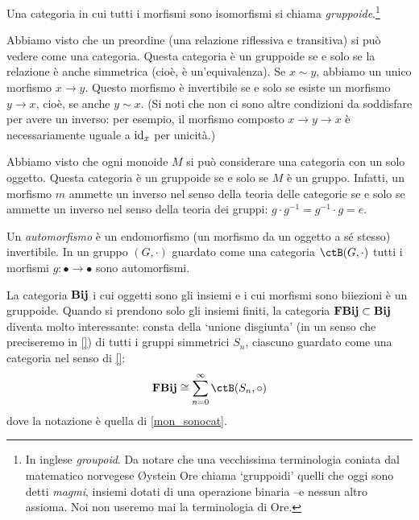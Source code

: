 \begin{definition}[Gruppoide]\label{def_gruppoide}
	Una categoria in cui tutti i morfismi sono isomorfismi si chiama \emph{gruppoide}.\footnote{In inglese \emph{groupoid}. Da notare che una vecchissima terminologia coniata dal matematico norvegese Øystein Ore chiama `gruppoidi' quelli che oggi sono detti \emph{magmi}, insiemi dotati di una operazione binaria --e nessun altro assioma. Noi non useremo mai la terminologia di Ore.}
\end{definition}
\begin{example}\label{exa_releq_groupoid}
	Abbiamo visto che un preordine (una relazione riflessiva e transitiva) si può vedere come una categoria. Questa categoria è un gruppoide se e solo se la relazione è anche simmetrica (cioè, è un'equivalenza). Se \(x\sim y\), abbiamo un unico morfismo \(x\to y\). Questo morfismo è invertibile se e solo se esiste un morfismo \(y\to x\), cioè, se anche \(y\sim x\). (Si noti che non ci sono altre condizioni da soddisfare per avere un inverso: per esempio, il morfismo composto \(x\to y\to x\) è necessariamente uguale a \(\mathrm{id}_x\) per unicità.)
\end{example}
\begin{example}\label{exa_grp_groupoid}
	Abbiamo visto che ogni monoide \(M\) si può considerare una categoria con un solo oggetto. Questa categoria è un gruppoide se e solo se \(M\) è un gruppo. Infatti, un morfismo \(m\) ammette un inverso nel senso della teoria delle categorie se e solo se ammette un inverso nel senso della teoria dei gruppi: \(g\cdot g^{-1}=g^{-1}\cdot g = e\).
\end{example}

Un \emph{automorfismo} è un endomorfismo (un morfismo da un oggetto a sé stesso) invertibile. In un gruppo $(G,\cdot)$ guardato come una categoria $\ctB(G,\cdot)$ tutti i morfismi $g : \bullet\to\bullet$ sono automorfismi.

\begin{example}
	La categoria $\mathbf{Bij}$ i cui oggetti sono gli insiemi e i cui morfismi sono biiezioni è un gruppoide. Quando si prendono solo gli insiemi finiti, la categoria $\mathbf{FBij}\subset\mathbf{Bij}$ diventa molto interessante: consta della `unione disgiunta' (in un senso che preciseremo in \ref{}) di tutti i gruppi simmetrici $S_n$, ciascuno guardato come una categoria nel senso di \ref{}:
	\[\cate{FBij}\cong \sum_{n=0}^\infty \ctB(S_n,\circ)\]
	dove la notazione è quella di \ref{mon_sonocat}.
\end{example}

